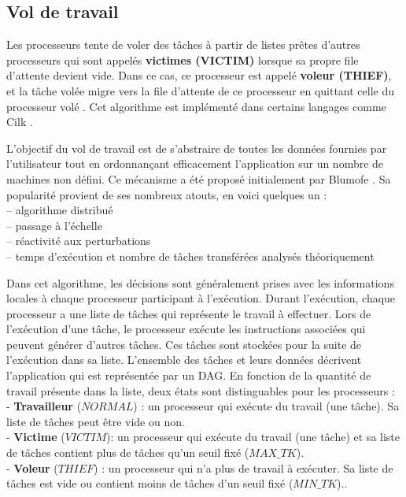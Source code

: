 \subsection{Vol de travail}
%
Les processeurs tente de voler des tâches à partir de listes prêtes d'autres processeurs qui sont appelés \textbf{victimes (VICTIM)} lorsque sa propre file d'attente devient vide. 
Dans ce cas, ce processeur est appelé \textbf{voleur (THIEF)}, et la tâche volée migre vers la file d'attente de ce processeur en quittant celle du processeur volé \cite{SPO09}. 
Cet algorithme est implémenté dans certains langages comme Cilk \cite{BLU95}. 

L'objectif du vol de travail est de s’abstraire de toutes les données fournies par l’utilisateur tout en ordonnançant efficacement l’application sur un nombre de machines non défini. 
Ce mécanisme a été proposé initialement par Blumofe \cite{BLU95}.
Sa popularité provient de ses nombreux atouts, en voici  quelques un :\\
– algorithme distribué\\
– passage à l’échelle\\
– réactivité aux perturbations\\
– temps d’exécution et nombre de tâches transférées analysés théoriquement

Dans cet algorithme, les décisions sont généralement prises avec les informations locales à chaque processeur participant à l’exécution. 
Durant l’exécution, chaque processeur a une liste de tâches qui représente le travail à effectuer. 
Lors de l’exécution d’une tâche, le processeur exécute les instructions associées qui peuvent générer d’autres tâches. 
Ces tâches sont stockées pour la suite de l’exécution dans sa liste. 
L’ensemble des tâches et leurs données décrivent l’application qui est représentée par un DAG.
En fonction de la quantité de travail présente dans la liste, deux états sont distinguables pour les processeurs :
\\
- \textbf{Travailleur} ($NORMAL$) : un processeur qui exécute du travail (une tâche). Sa liste de tâches peut être vide ou non.\\
- \textbf{Victime} ($VICTIM$): un processeur qui exécute du travail (une tâche) et sa liste de tâches contient plus de tâches qu'un seuil fixé ($MAX\_TK$).\\
- \textbf{Voleur} ($THIEF$) : un processeur qui n’a plus de travail à exécuter. Sa liste de tâches est vide ou contient moins de tâches d'un seuil fixé ($MIN\_TK$).. 

